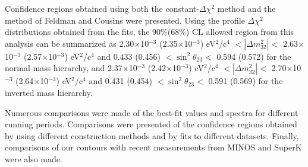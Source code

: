 Confidence regions obtained using both the constant-$\Delta\chi^2$ method and the 
method of Feldman and Cousins were presented.
Using the profile $\Delta\chi^2$ distributions obtained from the fits,
the 90\%(68\%) CL allowed region from this analysis can be summarized as
2.30$\times$10$^{-3}$ (2.35$\times$10$^{-3}$) eV$^{2}$/c$^{4}$ 
$< |\Delta m^{2}_{32}| < 
$ 2.63$\times$10$^{-3}$ (2.57$\times$10$^{-3}$) eV$^{2}$/c$^{4}$ 
and 
0.433 (0.456) $< \sin^{2}\theta_{23} <$ 0.594 (0.572)
for the normal mass hierarchy,
and
2.37$\times$10$^{-3}$ (2.42$\times$10$^{-3}$) eV$^{2}$/c$^{4}$ 
$< |\Delta m^{2}_{32}| < 
$ 2.70$\times$10$^{-3}$ (2.64$\times$10$^{-3}$) eV$^{2}$/c$^{4}$ 
and 
0.431 (0.454) $< \sin^{2}\theta_{23} <$ 0.591 (0.569)
for the inverted mass hierarchy.

Numerous comparisons were made of the best-fit values and spectra 
for different running periods.
Comparisons were presented of the confidence regions obtained
by using different construction methods and by fits to different datasets.
Finally, comparisons of our contours with
recent measurements from MINOS and SuperK
were also made. 

